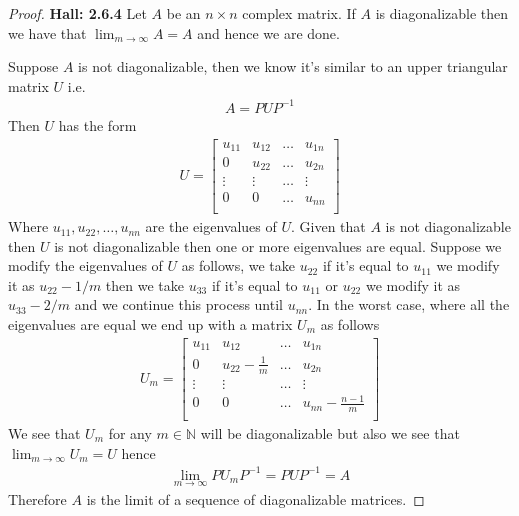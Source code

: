 \documentclass[11pt]{article}
\newcommand{\N}{\mathbb{N}}
\theoremstyle{definition}
\begin{document}
\cleardoublepage
\begin{proof}{\textbf{Hall: 2.6.4}}
    Let $A$ be an $n \times n$ complex matrix. If $A$ is diagonalizable then
    we have that $\lim_{m \to \infty} A = A$ and hence we are done.

    Suppose $A$ is not diagonalizable, then we know it's similar to an upper
    triangular matrix $U$ i.e.
    \begin{align*}
        A = P U P^{-1}
    \end{align*}
    Then $U$ has the form
    \begin{align*}
        U = \begin{bmatrix}
            u_{11} & u_{12} & \dots & u_{1n}\\
            0 & u_{22} & \dots & u_{2n}\\
            \vdots & \vdots & \dots & \vdots\\
            0 & 0 & \dots & u_{nn}\\
        \end{bmatrix}
    \end{align*}
    Where $u_{11}, u_{22}, \dots, u_{nn}$ are the eigenvalues of $U$. Given
    that $A$ is not diagonalizable then $U$ is not diagonalizable then 
    one or more eigenvalues are equal. Suppose we modify the eigenvalues
    of $U$ as follows, we take $u_{22}$ if it's equal to $u_{11}$ we modify it
    as $u_{22} - 1/m$ then we take $u_{33}$ if it's equal to $u_{11}$ or
    $u_{22}$ we modify it as $u_{33} - 2/m$ and we continue this process until
    $u_{nn}$. In the worst case, where all the eigenvalues are equal we
    end up with a matrix $U_m$ as follows
    \begin{align*}
        U_m = \begin{bmatrix}
            u_{11} & u_{12} & \dots & u_{1n}\\
            0 & u_{22} - \frac{1}{m} & \dots & u_{2n}\\
            \vdots & \vdots & \dots & \vdots\\
            0 & 0 & \dots & u_{nn} - \frac{n-1}{m}\\
        \end{bmatrix}
    \end{align*}
    We see that $U_m$ for any $m \in \N$ will be diagonalizable but also we see
    that $\lim_{m \to \infty} U_m = U$ hence
    \begin{align*}
        \lim_{m \to \infty} P U_m P^{-1} = P U P^{-1} = A
    \end{align*}
    Therefore $A$ is the limit of a sequence of diagonalizable matrices.
\end{proof}
\end{document}
